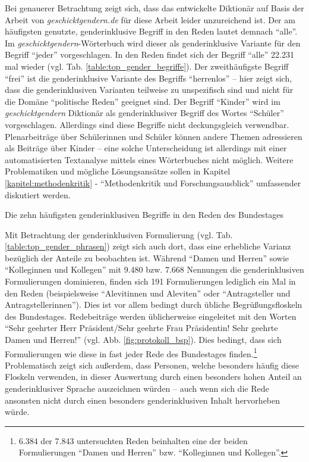 \documentclass[12pt, 
    twoside=false, 
    bibliography=totoc, 
    numbers=endperiod, 
    headings=normal, 
    toc=chapterentrydotfill
    ]{scrbook}
\begin{document}
Bei genauerer Betrachtung zeigt sich, dass das entwickelte Diktionär auf Basis der Arbeit von \emph{geschicktgendern.de} für diese Arbeit leider unzureichend ist. Der am häufigsten genutzte, genderinklusive Begriff in den Reden lautet demnach \enquote{alle}. Im \emph{geschicktgendern}-Wörterbuch wird dieser als genderinklusive Variante für den Begriff \enquote{jeder} vorgeschlagen. In den Reden findet sich der Begriff \enquote{alle} 22.231 mal wieder (vgl. Tab. \ref{table:top_gender_begriffe}). Der zweithäufigste Begriff \enquote{frei} ist die genderinklusive Variante des Begriffs \enquote{herrenlos} -- hier zeigt sich, dass die genderinklusiven Varianten teilweise zu unspezifisch sind und nicht für die Domäne \enquote{politische Reden} geeignet sind. Der Begriff \enquote{Kinder} wird im \emph{geschicktgendern} Diktionär als genderinklusiver Begriff des Wortes \enquote{Schüler} vorgeschlagen. Allerdings sind diese Begriffe nicht deckungsgleich verwendbar. Plenarbeiträge über Schülerinnen und Schüler können andere Themen adressieren als Beiträge über Kinder -- eine solche Unterscheidung ist allerdings mit einer automatisierten Textanalyse mittels eines Wörterbuches nicht möglich. Weitere Problematiken und mögliche Lösungsansätze sollen in Kapitel \ref{kapitel:methodenkritik} - \enquote{Methodenkritik und Forschungsausblick} umfassender diskutiert werden. 

\begin{table}
    \centering
    \caption[Die zehn häufigsten genderinklusiven Begriffe in den Reden des Bundestages]{Die zehn häufigsten genderinklusiven Begriffe in den Reden des Bundestages}
    
    \label{table:top_gender_begriffe}
\end{table}

Mit Betrachtung der genderinklusiven Formulierung (vgl. Tab. \ref{table:top_gender_phrasen}) zeigt sich auch dort, dass eine erhebliche Varianz bezüglich der Anteile zu beobachten ist. Während \enquote{Damen und Herren} sowie \enquote{Kolleginnen und Kollegen} mit 9.480 bzw. 7.668 Nennungen die genderinklusiven Formulierungen dominieren, finden sich 191 Formulierungen lediglich ein Mal in den Reden (beispielsweise \enquote{Alevitinnen und Aleviten} oder \enquote{Antragsteller und Antragstellerinnen}). Dies ist vor allem bedingt durch übliche Begrüßungsfloskeln des Bundestages. Redebeiträge werden üblicherweise eingeleitet mit den Worten \enquote{Sehr geehrter Herr Präsident/Sehr geehrte Frau Präsidentin! Sehr geehrte Damen und Herren!} (vgl. Abb. \ref{fig:protokoll_bsp}). Dies bedingt, dass sich Formulierungen wie diese in fast jeder Rede des Bundestages finden.\footnote{6.384 der 7.843 untersuchten Reden beinhalten eine der beiden Formulierungen \enquote{Damen und Herren} bzw. \enquote{Kolleginnen und Kollegen}.}
Problematisch zeigt sich außerdem, dass Personen, welche besonders häufig diese Floskeln verwenden, in dieser Auswertung durch einen besonders hohen Anteil an genderinklusiver Sprache auszeichnen würden -- auch wenn sich die Rede ansonsten nicht durch einen besonders genderinklusiven Inhalt hervorheben würde.
\end{document}
